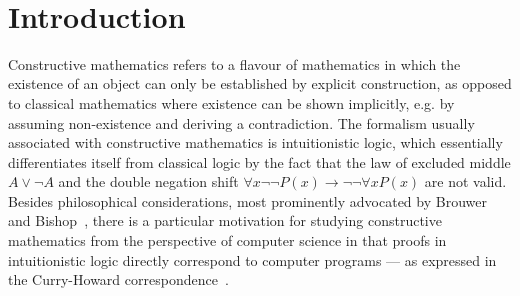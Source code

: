 \documentclass[a4paper,11pt]{report}
\theoremstyle{definition}
\theoremstyle{definition}
\theoremstyle{definition}
\theoremstyle{definition}
\theoremstyle{definition}
\theoremstyle{definition}
\theoremstyle{definition}
\begin{document}
	{\vfill\null}
	
	\newpage
	\
	\singlespacing
	\tableofcontents
	\restoregeometry

	\chapter{Introduction}
	\onehalfspacing


	Constructive mathematics refers to a flavour of mathematics in which the existence of an object can only be established by explicit construction, as opposed to classical mathematics where existence can be shown implicitly, e.g. by assuming non-existence and deriving a contradiction.
	The formalism usually associated with constructive mathematics is intuitionistic logic, which essentially differentiates itself from classical logic by the fact that the law of excluded middle $A\vee\neg A$ and the double negation shift $\forall x\neg\neg P(x)\to\neg\neg\forall xP(x)$ are not valid.
	Besides philosophical considerations, most prominently advocated by Brouwer~\cite{brouwer1907over} and Bishop~\cite{bishop1967foundations}, there is a particular motivation for studying constructive mathematics from the perspective of computer science in that proofs in  intuitionistic logic directly correspond to computer programs --- as expressed in the Curry-Howard correspondence~\cite{howard1980formulae}.
	
\end{document}
